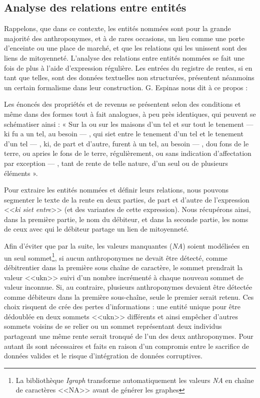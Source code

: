 \subsection{Analyse des relations entre entités}
Rappelons, que dans ce contexte, les entités nommées sont pour la grande majorité des anthroponymes, et à de rares occasions, un lieu comme une porte d'enceinte ou une place de marché, et que les relations qui les unissent sont des liens de mitoyenneté.
L'analyse des relations entre entités nommées se fait une fois de plus à l'aide d'expression régulière. Les entrées du registre de rentes, si en tant que telles, sont des données textuelles non structurées, présentent néanmoins un certain formalisme dans leur construction. G. Espinas nous dit à ce propos : 
\begin{displayquote}
    \og Les énoncés des propriétés et de revenus se présentent selon des conditions et même dans des formes tout à fait analogues, à peu près identiques, qui peuvent se schématiser ainsi : « Sur la ou sur les maisons d’un tel et sur tout le tenement — ki fu a un tel, au besoin — , qui siet entre le tenement d’un tel et le tenement d’un tel — , ki, de part et d’autre, furent à un tel, au besoin — , dou fons de le terre, ou apries le fons de le terre, régulièrement, ou sans indication d’affectation par exception — , tant de rente de telle nature, d’un seul ou de plusieurs éléments ».\fg{}
\end{displayquote} 
\vspace{0,5cm}
Pour extraire les entités nommées et définir leurs relations, nous pouvons segmenter le texte de la rente en deux parties, de part et d'autre de l'expression <<\textit{ki siet entre}>> (et des variantes de cette expression). Nous récupérons ainsi, dans la première partie, le nom du débiteur, et dans la seconde partie, les noms de ceux avec qui le débiteur partage un lien de mitoyenneté.

Afin d'éviter que par la suite, les valeurs manquantes (\textit{NA}) soient modélisées en un seul sommet\footnote{La bibliothèque \textit{Igraph} transforme automatiquement les valeurs \textit{NA} en chaîne de caractères <<NA>> avant de générer les graphes}, si aucun anthroponymes ne devait être détecté, comme débitrentier dans la première sous chaîne de caractère, le sommet prendrait la valeur <<ukn>> suivi d'un nombre incrémenté à chaque nouveau sommet de valeur inconnue. Si, au contraire, plusieurs anthroponymes devaient être détectée comme débiteurs  dans la première sous-chaîne, seule le premier serait retenu. Ces choix  risquent de crée des pertes d'informations :  une entité unique pour être dédoublée en deux sommets <<ukn>> différents et ainsi empêcher d'autres sommets voisins de se relier ou  un sommet représentant deux individus partageant une même rente serait tronqué de l'un des deux anthroponymes. Pour autant ils sont nécessaires et faits en raison d'un compromis entre le sacrifice de données valides et le risque d'intégration de données corruptives.




